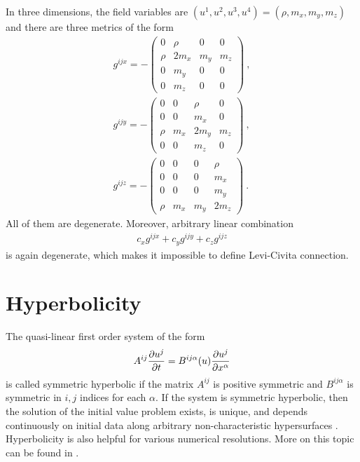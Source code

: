 \begin{example}
    In three dimensions, the field variables are $(u^1,u^2,u^3,u^4) = (\rho, m_x,m_y,m_z)$ and there are three metrics of the form
    \begin{align}
        g^{ij x} = -\begin{pmatrix}
            0 &  \rho & 0 & 0 \\
            \rho &  2 m_x &  m_y & m_z \\
            0 & m_y & 0 & 0 \\
            0 & m_z & 0 & 0
        \end{pmatrix}  \:, \\
        g^{ij y} = -\begin{pmatrix}
            0 & 0 & \rho & 0 \\
            0 & 0 & m_x & 0\\
            \rho & m_x & 2m_y & m_z \\
            0 & 0 & m_z & 0
        \end{pmatrix}  \:, \\
        g^{ij z} = -\begin{pmatrix}
            0 & 0 & 0 & \rho \\
            0 & 0 & 0 & m_x \\
            0 & 0 & 0 & m_y \\
            \rho & m_x & m_y & 2 m_z
        \end{pmatrix}  \:.
    \end{align}
    All of them are degenerate. Moreover, arbitrary linear combination
    \begin{align}
        c_x g^{ij x} + c_y g^{ij y} + c_z g^{ij z}
    \end{align}
    is again degenerate, which makes it impossible to define Levi-Civita connection.
\end{example}

\section{Hyperbolicity}

The quasi-linear first order system of the form
\begin{align}
    A^{ij} \frac{\partial u^j}{\partial t} = B^{ij \alpha}(u) \frac{\partial u^j}{\partial x^\alpha}
\end{align}
is called symmetric hyperbolic if the matrix $A^{ij}$ is positive symmetric and $B^{ij \alpha}$ is symmetric in $i,j$ indices for each $\alpha$. If the system is symmetric hyperbolic, then the solution of the initial value problem exists, is unique, and depends continuously on initial data along arbitrary non-characteristic hypersurfaces \cite{Pavelka}. Hyperbolicity is also helpful for various numerical resolutions. More on this topic can be found in \cite{Toro}. 

